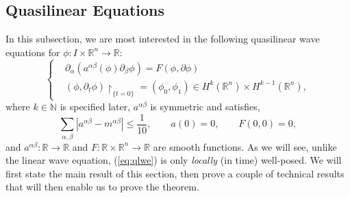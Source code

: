 \documentclass{article}
\begin{document}
\subsection{Quasilinear Equations} 
In this subsection, we are most interested in the following quasilinear wave equations for $\phi: I \times \mathbb{R}^{n} \to \mathbb{R}$: 
\begin{equation}
	\left\{
	\begin{alignedat}{1}
		&\partial_{\alpha}(a^{\alpha\beta}(\phi)\partial_{\beta}\phi) = F(\phi, \partial \phi) \\
		&(\phi, \partial_{t}\phi)\upharpoonright_{\{t = 0\}} = (\phi_{0}, \phi_{1}) \in H^{k}(\mathbb{R}^{n}) \times H^{k - 1}(\mathbb{R}^{n}), 
	\end{alignedat} 
	\right. 
	\label{eq:qlwe}
\end{equation}
where $k \in \mathbb{N}$ is specified later, $a^{\alpha\beta}$ is symmetric and satisfies, 
\begin{equation}
	\sum_{\alpha,\beta}|a^{\alpha\beta} - m^{\alpha\beta}| \leq \frac{1}{10}, \qquad a(0) =0, \qquad F(0,0) = 0, 
	\tag{$\ast$}
	\label{eq:assumptions-aF}
\end{equation} 
and $a^{\alpha\beta}: \mathbb{R} \to \mathbb{R}$ and $F: \mathbb{R}\times \mathbb{R}^{n} \to \mathbb{R}$ are smooth functions. As we will see, unlike the linear wave equation, (\ref{eq:qlwe}) is only \textit{locally} (in time) well-posed. We will first state the main result of this section, then prove a couple of technical results that will then enable us to prove the theorem. 
\end{document}
